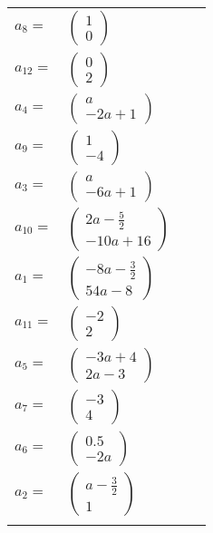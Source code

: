\documentclass[1p]{elsarticle_modified}
\theoremstyle{definition}
\begin{document}
\begin{tabular}{m{7pt} m{180pt} m{7pt} m{180pt} }
\flushright $a_{8}=$&$\begin{pmatrix}1\\0\end{pmatrix}$ \\
\flushright $a_{12}=$&$\begin{pmatrix}0\\2\end{pmatrix}$ \\
\flushright $a_{4}=$&$\begin{pmatrix}a\\-2 a+1\end{pmatrix}$ \\
\flushright $a_{9}=$&$\begin{pmatrix}1\\-4\end{pmatrix}$ \\
\flushright $a_{3}=$&$\begin{pmatrix}a\\-6 a+1\end{pmatrix}$ \\
\flushright $a_{10}=$&$\begin{pmatrix}2 a-\frac{5}{2}\\-10 a+16\end{pmatrix}$ \\
\flushright $a_{1}=$&$\begin{pmatrix}-8 a-\frac{3}{2}\\54 a-8\end{pmatrix}$ \\
\flushright $a_{11}=$&$\begin{pmatrix}-2\\2\end{pmatrix}$ \\
\flushright $a_{5}=$&$\begin{pmatrix}-3 a+4\\2 a-3\end{pmatrix}$ \\
\flushright $a_{7}=$&$\begin{pmatrix}-3\\4\end{pmatrix}$ \\
\flushright $a_{6}=$&$\begin{pmatrix}0.5\\-2 a\end{pmatrix}$ \\
\flushright $a_{2}=$&$\begin{pmatrix}a-\frac{3}{2}\\1\end{pmatrix}$\\&\end{tabular}
\end{document}

